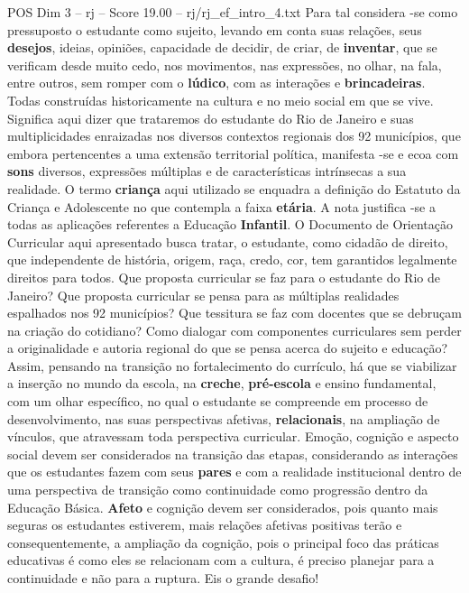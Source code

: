 \begin{textsample}{POS Dim 3 – rj – Score 19.00 – rj/rj\_ef\_intro\_4.txt}
Para tal considera -se como pressuposto o estudante como sujeito, levando em conta suas relações, seus \textbf{desejos}, ideias, opiniões, capacidade de decidir, de criar, de \textbf{inventar}, que se verificam desde muito cedo, nos movimentos, nas expressões, no olhar, na fala, entre outros, sem romper com o \textbf{lúdico}, com as interações e \textbf{brincadeiras}.
Todas construídas historicamente na cultura e no meio social em que se vive.
Significa aqui dizer que trataremos do estudante do Rio de Janeiro e suas multiplicidades enraizadas nos diversos contextos regionais dos 92 municípios, que embora pertencentes a uma extensão territorial política, manifesta -se e ecoa com \textbf{sons} diversos, expressões múltiplas e de características intrínsecas a sua realidade.
O termo \textbf{criança} aqui utilizado se enquadra a definição do Estatuto da Criança e Adolescente no que contempla a faixa \textbf{etária}.
A nota justifica -se a todas as aplicações referentes a Educação \textbf{Infantil}.
O Documento de Orientação Curricular aqui apresentado busca tratar, o estudante, como cidadão de direito, que independente de história, origem, raça, credo, cor, tem garantidos legalmente direitos para todos.
Que proposta curricular se faz para o estudante do Rio de Janeiro?
Que proposta curricular se pensa para as múltiplas realidades espalhados nos 92 municípios?
Que tessitura se faz com docentes que se debruçam na criação do cotidiano?
Como dialogar com componentes curriculares sem perder a originalidade e autoria regional do que se pensa acerca do sujeito e educação?
Assim, pensando na transição no fortalecimento do currículo, há que se viabilizar a inserção no mundo da escola, na \textbf{creche}, \textbf{pré-escola} e ensino fundamental, com um olhar específico, no qual o estudante se compreende em processo de desenvolvimento, nas suas perspectivas afetivas, \textbf{relacionais}, na ampliação de vínculos, que atravessam toda perspectiva curricular.
Emoção, cognição e aspecto social devem ser considerados na transição das etapas, considerando as interações que os estudantes fazem com seus \textbf{pares} e com a realidade institucional dentro de uma perspectiva de transição como continuidade como progressão dentro da Educação Básica. \textbf{Afeto} e cognição devem ser considerados, pois quanto mais seguras os estudantes estiverem, mais relações afetivas positivas terão e consequentemente, a ampliação da cognição, pois o principal foco das práticas educativas é como eles se relacionam com a cultura, é preciso planejar para a continuidade e não para a ruptura.
Eis o grande desafio!

\end{textsample}
